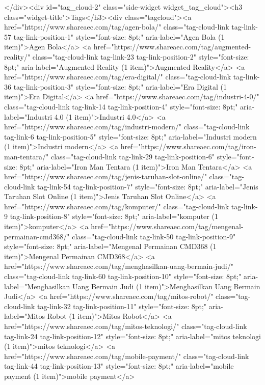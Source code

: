 {		</div><div id="tag_cloud-2" class="side-widget widget_tag_cloud"><h3 class="widget-title">Tags</h3><div class="tagcloud"><a href="https://www.shareaec.com/tag/agen-bola/" class="tag-cloud-link tag-link-57 tag-link-position-1" style="font-size: 8pt;" aria-label="Agen Bola (1 item)">Agen Bola</a>
<a href="https://www.shareaec.com/tag/augmented-reality/" class="tag-cloud-link tag-link-23 tag-link-position-2" style="font-size: 8pt;" aria-label="Augmented Reality (1 item)">Augmented Reality</a>
<a href="https://www.shareaec.com/tag/era-digital/" class="tag-cloud-link tag-link-36 tag-link-position-3" style="font-size: 8pt;" aria-label="Era Digital (1 item)">Era Digital</a>
<a href="https://www.shareaec.com/tag/industri-4-0/" class="tag-cloud-link tag-link-14 tag-link-position-4" style="font-size: 8pt;" aria-label="Industri 4.0 (1 item)">Industri 4.0</a>
<a href="https://www.shareaec.com/tag/industri-modern/" class="tag-cloud-link tag-link-6 tag-link-position-5" style="font-size: 8pt;" aria-label="Industri modern (1 item)">Industri modern</a>
<a href="https://www.shareaec.com/tag/iron-man-tentara/" class="tag-cloud-link tag-link-29 tag-link-position-6" style="font-size: 8pt;" aria-label="Iron Man Tentara (1 item)">Iron Man Tentara</a>
<a href="https://www.shareaec.com/tag/jenis-taruhan-slot-online/" class="tag-cloud-link tag-link-54 tag-link-position-7" style="font-size: 8pt;" aria-label="Jenis Taruhan Slot Online (1 item)">Jenis Taruhan Slot Online</a>
<a href="https://www.shareaec.com/tag/komputer/" class="tag-cloud-link tag-link-9 tag-link-position-8" style="font-size: 8pt;" aria-label="komputer (1 item)">komputer</a>
<a href="https://www.shareaec.com/tag/mengenal-permainan-cmd368/" class="tag-cloud-link tag-link-50 tag-link-position-9" style="font-size: 8pt;" aria-label="Mengenal Permainan CMD368 (1 item)">Mengenal Permainan CMD368</a>
<a href="https://www.shareaec.com/tag/menghasilkan-uang-bermain-judi/" class="tag-cloud-link tag-link-60 tag-link-position-10" style="font-size: 8pt;" aria-label="Menghasilkan Uang Bermain Judi (1 item)">Menghasilkan Uang Bermain Judi</a>
<a href="https://www.shareaec.com/tag/mitos-robot/" class="tag-cloud-link tag-link-32 tag-link-position-11" style="font-size: 8pt;" aria-label="Mitos Robot (1 item)">Mitos Robot</a>
<a href="https://www.shareaec.com/tag/mitos-teknologi/" class="tag-cloud-link tag-link-24 tag-link-position-12" style="font-size: 8pt;" aria-label="mitos teknologi (1 item)">mitos teknologi</a>
<a href="https://www.shareaec.com/tag/mobile-payment/" class="tag-cloud-link tag-link-44 tag-link-position-13" style="font-size: 8pt;" aria-label="mobile payment (1 item)">mobile payment</a>
}
